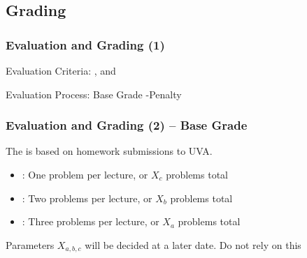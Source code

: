 \documentclass{beamer}
\begin{document}
\subsection{Grading}

\begin{frame}
  \frametitle{Evaluation and Grading (1)}

  Evaluation Criteria: , 
  and 
  
  \bigskip

  Evaluation Process: Base Grade  \alert{-Penalty}
\end{frame}

\begin{frame}
  \frametitle{Evaluation and Grading (2) -- Base Grade}

  The  is based on homework submissions to UVA.

  \bigskip
  
  \begin{itemize}
  \item {}: One problem per lecture, or $X_c$ problems total

    \medskip

  \item {}: Two problems per lecture, or $X_b$ problems total

    \medskip

  \item {}: Three problems per lecture, or $X_a$ problems total
  \end{itemize}

  \vfill

  {\small
  Parameters $X_{a,b,c}$ will be decided at a later date. \alert{Do not rely on this}}

\end{frame}
\end{document}
